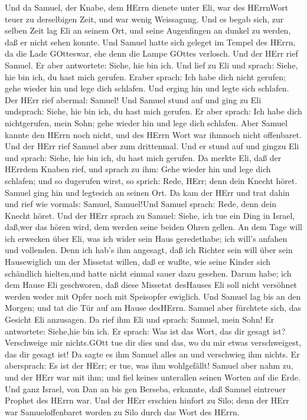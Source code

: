  Und da Samuel, der Knabe, dem HErrn dienete unter Eli, war
des HErrnWort teuer zu derselbigen Zeit, und war wenig Weissagung.
 Und es begab sich, zur selben Zeit lag Eli an seinem Ort,
und seine Augenfingen an dunkel zu werden, daß er nicht sehen konnte.
 Und Samuel hatte sich geleget im Tempel des HErrn, da die
Lade GOtteswar, ehe denn die Lampe GOttes verlosch.  Und der
HErr rief Samuel. Er aber antwortete: Siehe, hie bin ich. 
Und lief zu Eli und sprach: Siehe, hie bin ich, du hast mich gerufen.
Eraber sprach: Ich habe dich nicht gerufen; gehe wieder hin und lege
dich schlafen. Und erging hin und legte sich schlafen.  Der
HErr rief abermal: Samuel! Und Samuel stund auf und ging zu Eli
undsprach: Siehe, hie bin ich, du hast mich gerufen. Er aber sprach: Ich
habe dich nichtgerufen, mein Sohn; gehe wieder hin und lege dich
schlafen.  Aber Samuel kannte den HErrn noch nicht, und des
HErrn Wort war ihmnoch nicht offenbaret.  Und der HErr rief
Samuel aber zum drittenmal. Und er stund auf und gingzu Eli und sprach:
Siehe, hie bin ich, du hast mich gerufen. Da merkte Eli, daß der HErrdem
Knaben rief,  und sprach zu ihm: Gehe wieder hin und lege
dich schlafen; und so dugerufen wirst, so sprich: Rede, HErr; denn dein
Knecht höret. Samuel ging hin und legtesich an seinen Ort. 
Da kam der HErr und trat dahin und rief wie vormals: Samuel, Samuel!Und
Samuel sprach: Rede, denn dein Knecht höret.  Und der HErr
sprach zu Samuel: Siehe, ich tue ein Ding in Israel, daß,wer das hören
wird, dem werden seine beiden Ohren gellen.  An dem Tage
will ich erwecken über Eli, was ich wider sein Haus geredethabe; ich
will's anfahen und vollenden.  Denn ich hab's ihm angesagt,
daß ich Richter sein will über sein Hausewiglich um der Missetat willen,
daß er wußte, wie seine Kinder sich schändlich hielten,und hatte nicht
einmal sauer dazu gesehen.  Darum habe; ich dem Hause Eli
geschworen, daß diese Missetat desHauses Eli soll nicht versöhnet werden
weder mit Opfer noch mit Speisopfer ewiglich.  Und Samuel
lag bis an den Morgen; und tat die Tür auf am Hause desHErrn. Samuel
aber fürchtete sich, das Gesicht Eli anzusagen.  Da rief
ihm Eli und sprach: Samuel, mein Sohn! Er antwortete: Siehe,hie bin ich.
 Er sprach: Was ist das Wort, das dir gesagt ist?
Verschweige mir nichts.GOtt tue dir dies und das, wo du mir etwas
verschweigest, das dir gesagt ist!  Da sagte es ihm Samuel
alles an und verschwieg ihm nichts. Er abersprach: Es ist der HErr; er
tue, was ihm wohlgefällt!  Samuel aber nahm zu, und der
HErr war mit ihm; und fiel keines unterallen seinen Worten auf die Erde.
 Und ganz Israel, von Dan an bis gen Berseba, erkannte, daß
Samuel eintreuer Prophet des HErrn war.  Und der HErr
erschien hinfort zu Silo; denn der HErr war Samueloffenbaret worden zu
Silo durch das Wort des HErrn.

